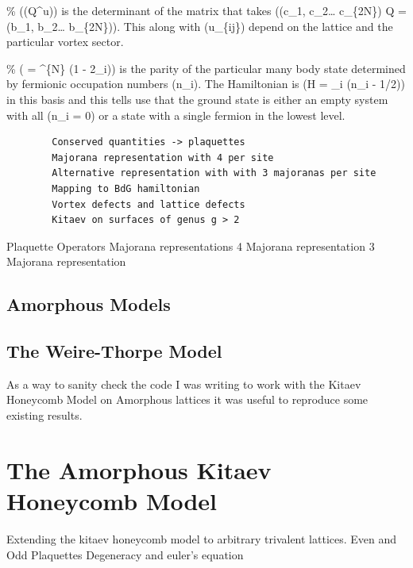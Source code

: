 \% ((Q\^{}u)) is the determinant of the matrix that takes
((c\_1, c\_2\ldots{} c\_\{2N\}) Q = (b\_1, b\_2\ldots{} b\_\{2N\})).
This along with (\prod u\_\{ij\}) depend on the lattice and the
particular vortex sector.

\% (\hat{\pi} = \^{}\{N\} (1 - 2\_i)) is the parity of
the particular many body state determined by fermionic occupation
numbers (n\_i). The Hamiltonian is (H = \sum \epsilon\_i (n\_i - 1/2))
in this basis and this tells use that the ground state is either an
empty system with all (n\_i = 0) or a state with a single fermion in the
lowest level.

\begin{verbatim}
        Conserved quantities -> plaquettes
        Majorana representation with 4 per site
        Alternative representation with with 3 majoranas per site
        Mapping to BdG hamiltonian
        Vortex defects and lattice defects
        Kitaev on surfaces of genus g > 2
\end{verbatim}

Plaquette Operators Majorana representations 4 Majorana representation 3
Majorana representation

\subsection{Amorphous Models}
            \subsection{The Weire-Thorpe Model}

As a way to sanity check the code I was writing to work with the Kitaev
Honeycomb Model on Amorphous lattices it was useful to reproduce some
existing results.

\section{The Amorphous Kitaev Honeycomb Model}

Extending the kitaev honeycomb model to arbitrary trivalent lattices.
Even and Odd Plaquettes Degeneracy and euler's equation

